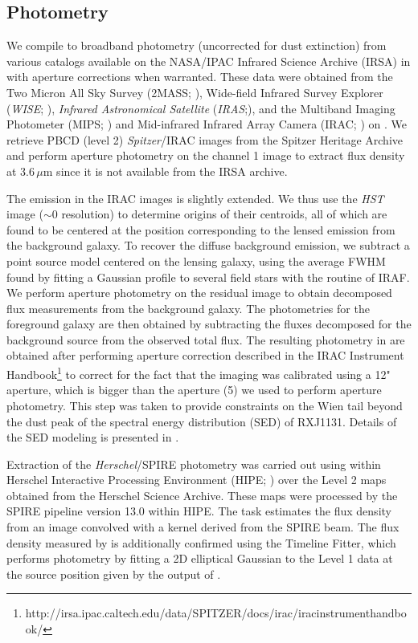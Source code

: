 \documentclass[]{emulateapj}
\begin{document}
\subsection{Photometry} \label{sec:photometry} %
We compile \mir to \fir broadband photometry (uncorrected for
dust extinction) from various
catalogs available on the NASA/IPAC Infrared Science
Archive (IRSA) in  with aperture corrections
when warranted. These data were obtained from
the Two Micron All Sky Survey (2MASS; \citealt{Skrutskie06a}),
Wide-field Infrared Survey Explorer ({\it WISE}; \citealt{Wright10a}),
{\it Infrared Astronomical Satellite}
({\it IRAS};\citealt{Neugebauer84a}), and
the Multiband Imaging Photometer (MIPS; \citealt{Rieke04a}) and
Mid-infrared Infrared Array Camera (IRAC; \citealt{Fazio04a}) on
\spitzer.
We retrieve PBCD (level 2) {\it Spitzer}/IRAC images from the
Spitzer Heritage Archive and perform aperture photometry on
the channel 1 image to extract flux density at 3.6\,$\mu$m
since it is not available from the IRSA archive.

The emission in the IRAC images is slightly extended. We thus use the
{\it HST} image ($\sim$0 resolution) to determine
origins of their centroids, all of which are found to be
centered at the position corresponding to the lensed emission from the
background galaxy. To recover the diffuse background emission, we subtract a
point source model centered on the lensing galaxy, using the average
FWHM found by fitting a Gaussian profile to several field stars
with the  routine of IRAF.
We perform aperture photometry on the residual image
to obtain decomposed flux measurements from the background galaxy.
The photometries for the foreground galaxy are then obtained
by subtracting the fluxes decomposed for the background source
from the observed total flux. The resulting photometry in
 are obtained after performing aperture correction
described in the IRAC Instrument Handbook\footnote{http://irsa.ipac.caltech.edu/data/SPITZER/docs/irac/iracinstrumenthandbook/} to
correct for the fact that the imaging was calibrated
using a 12" aperture, which is bigger than the aperture (5) we used to
perform aperture photometry. This step was taken to provide
constraints on the Wien tail beyond the dust peak of the
spectral energy distribution (SED) of RXJ1131.
Details of the SED modeling is presented in .

Extraction of the {\it Herschel}/SPIRE photometry was
carried out using  within Herschel Interactive
Processing Environment (HIPE; \citealt{Ott10a})
over the Level 2 maps obtained from the Herschel Science Archive.
These maps were processed by the SPIRE pipeline
version 13.0 within HIPE. The  task estimates
the flux density from an image convolved with a kernel
derived from the SPIRE beam. The flux density
measured by  is additionally confirmed
using the Timeline Fitter, which performs photometry
by fitting a 2D elliptical Gaussian to the Level 1 data at the
source position given by the output of .
\end{document}
